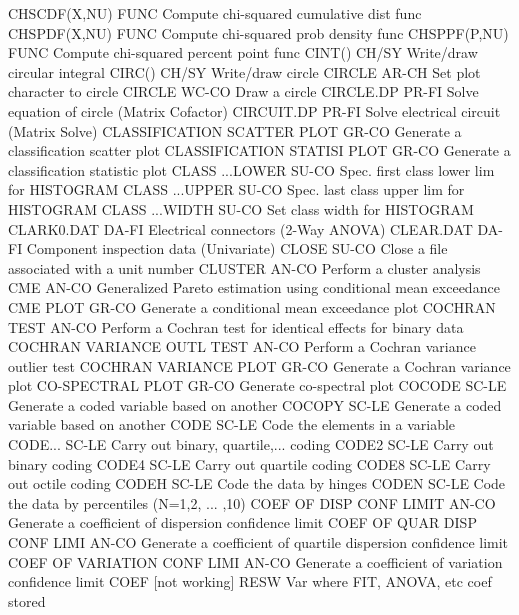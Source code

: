 CHSCDF(X,NU)                FUNC  Compute chi-squared cumulative dist func
CHSPDF(X,NU)                FUNC  Compute chi-squared prob density func
CHSPPF(P,NU)                FUNC  Compute chi-squared percent point func
CINT()                      CH/SY Write/draw circular integral
CIRC()                      CH/SY Write/draw circle
CIRCLE                      AR-CH Set plot character to circle
CIRCLE                      WC-CO Draw a circle
CIRCLE.DP                   PR-FI Solve equation of circle (Matrix Cofactor)
CIRCUIT.DP                  PR-FI Solve electrical circuit (Matrix Solve)
CLASSIFICATION SCATTER PLOT GR-CO Generate a classification scatter plot
CLASSIFICATION STATISI PLOT GR-CO Generate a classification statistic plot
CLASS ...LOWER              SU-CO Spec. first class lower lim for HISTOGRAM
CLASS ...UPPER              SU-CO Spec. last class upper lim for HISTOGRAM
CLASS ...WIDTH              SU-CO Set class width for HISTOGRAM
CLARK0.DAT                  DA-FI Electrical connectors (2-Way ANOVA)
CLEAR.DAT                   DA-FI Component inspection data (Univariate)
CLOSE                       SU-CO Close a file associated with a unit number
CLUSTER                     AN-CO Perform a cluster analysis
CME                         AN-CO Generalized Pareto estimation using conditional mean exceedance
CME PLOT                    GR-CO Generate a conditional mean exceedance plot
COCHRAN TEST                AN-CO Perform a Cochran test for identical effects for binary data
COCHRAN VARIANCE OUTL TEST  AN-CO Perform a Cochran variance outlier test
COCHRAN VARIANCE PLOT       GR-CO Generate a Cochran variance plot
CO-SPECTRAL PLOT            GR-CO Generate co-spectral plot
COCODE                      SC-LE Generate a coded variable based on another
COCOPY                      SC-LE Generate a coded variable based on another
CODE                        SC-LE Code the elements in a variable
CODE...                     SC-LE Carry out binary, quartile,... coding
CODE2                       SC-LE Carry out binary coding
CODE4                       SC-LE Carry out quartile coding
CODE8                       SC-LE Carry out octile coding
CODEH                       SC-LE Code the data by hinges
CODEN                       SC-LE Code the data by percentiles (N=1,2, ... ,10)
COEF OF DISP CONF LIMIT     AN-CO Generate a coefficient of dispersion confidence limit
COEF OF QUAR DISP CONF LIMI AN-CO Generate a coefficient of quartile dispersion confidence limit
COEF OF VARIATION CONF LIMI AN-CO Generate a coefficient of variation confidence limit
COEF [not working]          RESW  Var where FIT, ANOVA, etc coef stored
